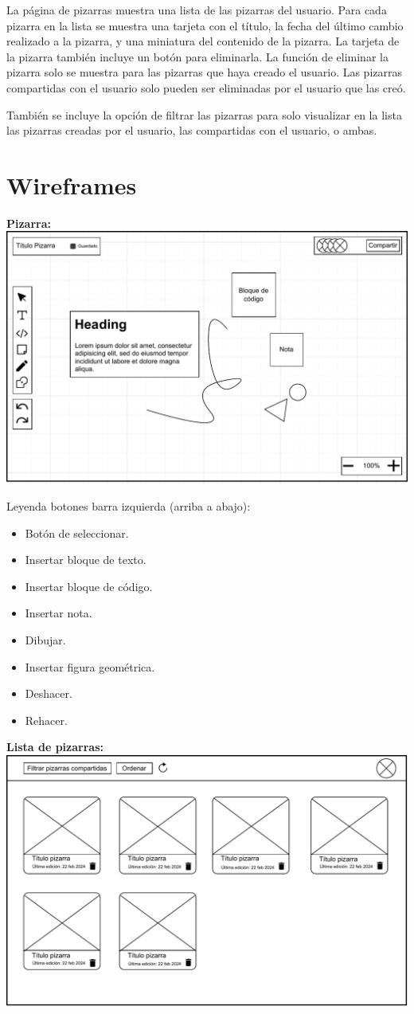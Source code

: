 \documentclass[a4paper, oneside, final]{scrartcl}
\begin{document}
La página de pizarras muestra una lista de las pizarras del usuario. Para cada pizarra en la lista se muestra una tarjeta con el título, la fecha del último cambio realizado a la pizarra, y una miniatura del contenido de la pizarra. La tarjeta de la pizarra también incluye un botón para eliminarla. La función de eliminar la pizarra solo se muestra para las pizarras que haya creado el usuario. Las pizarras compartidas con el usuario solo pueden ser eliminadas por el usuario que las creó. 

También se incluye la opción de filtrar las pizarras para solo visualizar en la lista las pizarras creadas por el usuario, las compartidas con el usuario, o ambas.

  
\section{Wireframes}
\textbf{\large Pizarra:}\\[3mm]
\includegraphics[width=\textwidth]{images/WireframePizarra.drawio.pdf}

Leyenda botones barra izquierda (arriba a abajo):
\begin{itemize}
    \item Botón de seleccionar.
    \item Insertar bloque de texto.
    \item Insertar bloque de código.
    \item Insertar nota.
    \item Dibujar.
    \item Insertar figura geométrica.
    \item Deshacer.
    \item Rehacer.
\end{itemize}

\textbf{\large Lista de pizarras:}\\[3mm]
\includegraphics[width=\textwidth]{images/WireframeListaPizarras.drawio.pdf}
\end{document}

